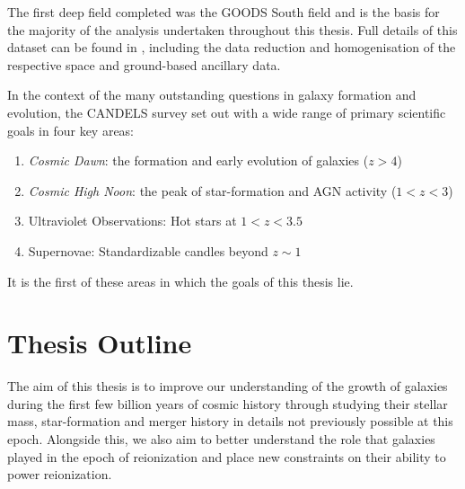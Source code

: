The first deep field completed was the GOODS South field and is the basis for the majority of the analysis undertaken throughout this thesis. Full details of this dataset can be found in \citet{Guo:2013ig}, including the data reduction and homogenisation of the respective space and ground-based ancillary data. 

In the context of the many outstanding questions in galaxy formation and evolution, the CANDELS survey set out with a wide range of primary scientific goals in four key areas:

\begin{enumerate}
		\item \emph{Cosmic Dawn}: the formation and early evolution of galaxies ($z > 4$)
		\item \emph{Cosmic High Noon}: the peak of star-formation and AGN activity ($1 < z < 3$)
		\item Ultraviolet Observations: Hot stars at $1 < z < 3.5$
		\item Supernovae: Standardizable candles beyond $z\sim1$
\end{enumerate}

It is the first of these areas in which the goals of this thesis lie.

%	

\section{Thesis Outline}

The aim of this thesis is to improve our understanding of the growth of galaxies during the first few billion years of cosmic history through studying their stellar mass, star-formation and merger history in details not previously possible at this epoch. Alongside this, we also aim to better understand the role that galaxies played in the epoch of reionization and place new constraints on their ability to power reionization.

